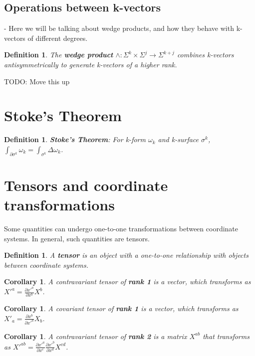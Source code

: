 \documentclass{book}
\newtheorem{defn}[equation]{Definition}
\newtheorem{coro}[equation]{Corollary}
\begin{document}
\subsection{Operations between k-vectors}

- Here we will be talking about wedge products, and how they behave with k-vectors of different degrees. 

\begin{defn}
	
	The \textbf{wedge product} $\wedge : \Sigma^k\times \Sigma^j \to \Sigma^{k+j}$ combines k-vectors antisymmetrically to generate k-vectors of a higher rank. 
\end{defn}


TODO: Move this up 




\section{Stoke's Theorem}


\begin{defn}
	\textbf{Stoke's Theorem}: For k-form $\omega_k$ and k-surface $\sigma^k$, $\int_{\partial \sigma^k}\omega_k = \int_{\sigma^k}\Delta\omega_k$. 
\end{defn}

\section{Tensors and coordinate transformations}
Some quantities can undergo one-to-one transformations between coordinate systems. In general, such quantities are tensors. 


\begin{defn}
	A \textbf{tensor} is an object with a one-to-one relationship with objects between coordinate systems. 
\end{defn}

\begin{coro}
	A contravariant tensor of \textbf{rank 1} is a vector, which transforms as  $X'^a = \frac{\partial x'^a}{\partial x^b} X^b$.  
\end{coro}

\begin{coro}
	A covariant tensor of \textbf{rank 1} is a vector, which transforms as $X'_a = \frac{\partial x^b}{\partial x'^a} X_b$. 
\end{coro}

\begin{coro}
	A contravariant tensor of \textbf{rank 2} is a matrix $X^{ab}$ that transforms as $X'^{ab} = \frac{\partial x'^a}{\partial x^c} \frac{\partial x'^b}{\partial x^d} X^{cd}$. 
\end{coro}
\end{document}

